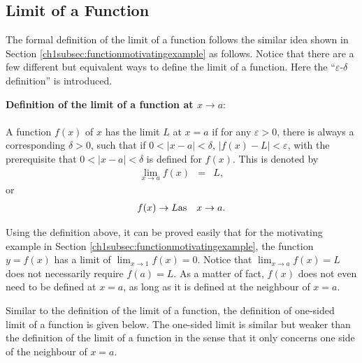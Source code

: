 \subsection{Limit of a Function} \label{ch1subsec:definationoflimitoffunction}

The formal definition of the limit of a function follows the similar idea shown in Section \ref{ch1subsec:functionmotivatingexample} as follows. Notice that there are a few different but equivalent ways to define the limit of a function. Here the ``$\varepsilon$-$\delta$ definition'' is introduced.

\begin{VF}
\textbf{Definition of the limit of a function at $x\rightarrow a$}:
\\
\\
\noindent A function $f(x)$ of $x$ has the limit $L$ at $x=a$ if for any $\varepsilon > 0$, there is always a corresponding $\delta > 0$, such that if $0<|x-a|<\delta$, $|f(x)-L| < \varepsilon$, with the prerequisite that $0<|x-a|<\delta$ is defined for $f(x)$. This is denoted by
\begin{eqnarray}
   \lim_{x\rightarrow a} f(x) &=& L, \nonumber
\end{eqnarray}
or
\begin{eqnarray}
  f(x) \rightarrow L & \textup{as} & x \rightarrow a. \nonumber
\end{eqnarray}
\end{VF}

Using the definition above, it can be proved easily that for the motivating example in Section \ref{ch1subsec:functionmotivatingexample}, the function $y=f(x)$ has a limit of $\lim_{x\rightarrow 1}f(x)=0$. Notice that $\lim_{x\rightarrow a}f(x)=L$ does not necessarily require $f(a)=L$. As a matter of fact, $f(x)$ does not even need to be defined at $x=a$, as long as it is defined at the neighbour of $x=a$.

Similar to the definition of the limit of a function, the definition of one-sided limit of a function is given below. The one-sided limit is similar but weaker than the definition of the limit of a function in the sense that it only concerns one side of the neighbour of $x=a$.

